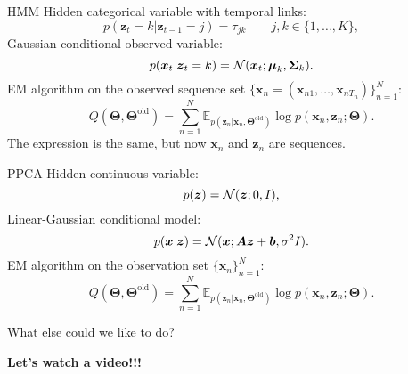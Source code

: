 \documentclass{beamer}
\newcommand{\bs}[1]{\boldsymbol{#1}}
\begin{document}
\begin{frame}{HMM}
 Hidden categorical variable with temporal links:
 \begin{equation*} p(\bs{z}_t=k|\bs{z}_{t-1}=j) = \tau_{jk} \qquad j,k\in\{1,\ldots,K\},\end{equation*}
 Gaussian conditional observed variable:
 \begin{equation*} p(\bs{x}_t|\bs{z}_t=k) = {\cal N}(\bs{x}_t;\bs{\mu}_k,\bs{\Sigma}_k).\end{equation*}
 EM algorithm on the observed sequence set $\{\bs{x}_n=(\bs{x}_{n1},\ldots,\bs{x}_{nT_n})\}_{n=1}^N$:
 \begin{equation*} Q(\bs{\Theta},\bs{\Theta}^{\textrm{old}}) =  \sum_{n=1}^N\mathbb{E}_{p(\bs{z}_n|\bs{x}_n,\bs{\Theta}^{\textrm{old}})} \log p(\bs{x}_n,\bs{z}_n;\bs{\Theta}).\end{equation*}
 The expression is the same, but now $\bs{x}_n$ and $\bs{z}_n$ are sequences.
\end{frame}

\begin{frame}{PPCA}
Hidden continuous variable:
\begin{equation*} p(\bs{z}) = {\cal N}(\bs{z};0,I),\end{equation*}
Linear-Gaussian conditional model:
\begin{equation*} p(\bs{x}|\bs{z}) = {\cal N}(\bs{x};\bs{A}\bs{z}+\bs{b},\sigma^2 I).\end{equation*}
EM algorithm on the observation set $\{\bs{x}_n\}_{n=1}^N$:
\begin{equation*} Q(\bs{\Theta},\bs{\Theta}^{\textrm{old}}) =  \sum_{n=1}^N\mathbb{E}_{p(\bs{z}_n|\bs{x}_n,\bs{\Theta}^{\textrm{old}})} \log p(\bs{x}_n,\bs{z}_n;\bs{\Theta}).\end{equation*}
\end{frame}

\begin{frame}{What else could we like to do?}
 \begin{center}
  \textbf{\large Let's watch a video!!!}
 \end{center}
\end{frame}
\end{document}

